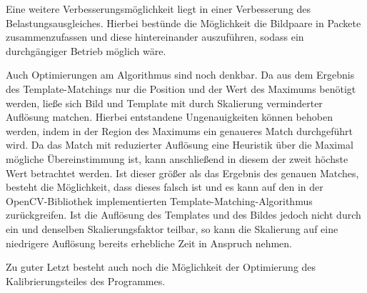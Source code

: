 Eine weitere Verbesserungsmöglichkeit liegt in einer Verbesserung des Belastungsausgleiches. Hierbei bestünde die Möglichkeit die Bildpaare in Packete zusammenzufassen und diese hintereinander auszuführen, sodass ein durchgängiger Betrieb möglich wäre. 

Auch Optimierungen am Algorithmus sind noch denkbar. Da aus dem Ergebnis des Template-Matchings nur die Position und der Wert des Maximums benötigt werden, ließe sich Bild und Template mit durch Skalierung verminderter Auflösung matchen. Hierbei entstandene Ungenauigkeiten können behoben werden, indem in der Region des Maximums ein genaueres Match durchgeführt wird. Da das Match mit reduzierter Auflösung eine Heuristik über die Maximal mögliche Übereinstimmung ist, kann anschließend in diesem der zweit höchste Wert betrachtet werden. Ist dieser größer als das Ergebnis des genauen Matches, besteht die Möglichkeit, dass dieses falsch ist und es kann auf den in der OpenCV-Bibliothek implementierten Template-Matching-Algorithmus zurückgreifen. Ist die Auflösung des Templates und des Bildes jedoch nicht durch ein und denselben Skalierungsfaktor teilbar, so kann die Skalierung auf eine niedrigere Auflösung bereits erhebliche Zeit in Anspruch nehmen. 

Zu guter Letzt besteht auch noch die Möglichkeit der Optimierung des Kalibrierungsteiles des Programmes. 